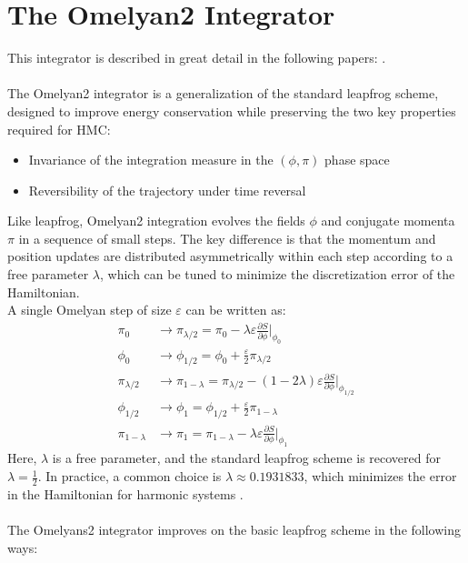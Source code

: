 \section{The Omelyan2 Integrator}
This integrator is described in great detail in the following papers: \cite{Takaishi2005Symplectic,Omelyan2002Symplectic}. \\\\
The Omelyan2 integrator is a generalization of the standard leapfrog scheme, designed to improve 
energy conservation while preserving the two key properties required for HMC: 
\begin{itemize}
    \item Invariance of the integration measure in the $(\phi, \pi)$ phase space
    \item Reversibility of the trajectory under time reversal
\end{itemize}
Like leapfrog, Omelyan2 integration evolves the fields $\phi$ and conjugate momenta $\pi$ in a sequence of small steps. The key difference is that the momentum and position updates are distributed asymmetrically within each step according to a free parameter $\lambda$, which can be tuned to minimize the discretization error of the Hamiltonian. \\
A single Omelyan step of size $\varepsilon$ can be written as:
\begin{align}
\pi_0 &\rightarrow \pi_{\lambda/2} = \pi_0 - \lambda \varepsilon \frac{\partial S}{\partial \phi}\bigg|_{\phi_0} \\
\phi_0 &\rightarrow \phi_{1/2} = \phi_0 + \frac{\varepsilon}{2} \pi_{\lambda/2} \\
\pi_{\lambda/2} &\rightarrow \pi_{1-\lambda} = \pi_{\lambda/2} - (1-2\lambda) \varepsilon \frac{\partial S}{\partial \phi}\bigg|_{\phi_{1/2}} \\
\phi_{1/2} &\rightarrow \phi_1 = \phi_{1/2} + \frac{\varepsilon}{2} \pi_{1-\lambda} \\
\pi_{1-\lambda} &\rightarrow \pi_1 = \pi_{1-\lambda} - \lambda \varepsilon \frac{\partial S}{\partial \phi}\bigg|_{\phi_1}
\end{align}
Here, $\lambda$ is a free parameter, and the standard leapfrog scheme is recovered for $\lambda = \frac{1}{2}$. In practice, a common 
choice is $\lambda \approx 0.1931833$, which minimizes the error in the Hamiltonian for harmonic systems \cite{Takaishi2005Symplectic,Omelyan2002Symplectic}.\\\\
The Omelyans2 integrator improves on the basic leapfrog scheme in the following ways:
